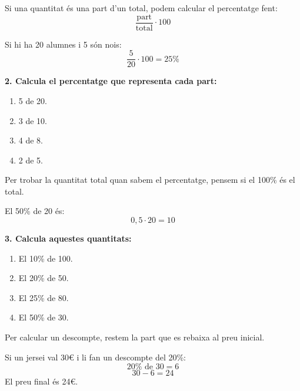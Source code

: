 \documentclass[12pt,a4paper]{article}
\begin{document}
\begin{capsula}
Si una quantitat és una part d'un total, podem calcular el percentatge fent:
\[
\frac{\text{part}}{\text{total}}\cdot 100
\]
\end{capsula}

\begin{exemple}
Si hi ha 20 alumnes i 5 són nois:
\[
\frac{5}{20}\cdot 100=25\%
\]
\end{exemple}

\textbf{2. Calcula el percentatge que representa cada part:}
\begin{enumerate}[label=\alph*)]
    \item 5 de 20. \vspace{0.8cm}
    \item 3 de 10. \vspace{0.8cm}
    \item 4 de 8. \vspace{0.8cm}
    \item 2 de 5. \vspace{0.8cm}
\end{enumerate}

\begin{capsula}
Per trobar la quantitat total quan sabem el percentatge, pensem si el 100\% és el total.
\end{capsula}

\begin{exemple}
El 50\% de 20 és:
\[
0,5\cdot 20=10
\]
\end{exemple}

\textbf{3. Calcula aquestes quantitats:}
\begin{enumerate}[label=\alph*)]
    \item El 10\% de 100. \vspace{0.8cm}
    \item El 20\% de 50. \vspace{0.8cm}
    \item El 25\% de 80. \vspace{0.8cm}
    \item El 50\% de 30. \vspace{0.8cm}
\end{enumerate}

\begin{capsula}
Per calcular un descompte, restem la part que es rebaixa al preu inicial.
\end{capsula}

\begin{exemple}
Si un jersei val 30€ i li fan un descompte del 20\%:
\[
20\% \text{ de } 30 = 6
\]
\[
30-6=24
\]
El preu final és 24€.
\end{exemple}
\end{document}
